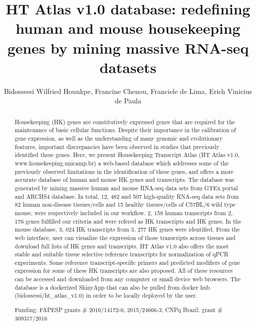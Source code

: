 \documentclass[twoside]{article}
\title{\vspace{-15mm}\fontsize{24pt}{10pt}\selectfont\textbf{ HT Atlas v1.0 database: redefining human and mouse housekeeping genes by mining massive RNA-seq datasets }} %
\author{ Bidossessi Wilfried Hounkpe, Francine Chenou, Franciele de Lima, Erich Vinicius de Paula }
\affil{ Faculty of Medical Sciences,  Unicamp }
\date{}
\begin{document}
  
  
  \maketitle %
  
  
  \thispagestyle{fancy} %
  
  
  \begin{abstract}
  Housekeeping (HK) genes are constitutively expressed genes that are required for the maintenance of basic cellular functions. Despite their importance in the calibration of gene expression,  as well as the understanding of many genomic and evolutionary features,  important discrepancies have been observed in studies that previously identified these genes. Here,  we present Housekeeping Transcript Atlas (HT Atlas v1.0,  www.housekeeping.unicamp.br) a web-based database which addresses some of the previously observed limitations in the identification of these genes,  and offers a more accurate database of human and mouse HK genes and transcripts. The database was generated by mining massive human and mouse RNA-seq data sets from GTEx portal and ARCHS4 database. In total,  12, 482 and 507 high-quality RNA-seq data sets from 82 human non-disease tissues/cells and 15 healthy tissues/cells of C57BL/6 wild type mouse,  were respectively included in our workflow. 2, 158 human transcripts from 2, 176 genes fulfilled our criteria and were refered as  HK transcripts and HK genes. In the mouse database,  3, 024 HK transcripts from 3, 277 HK genes were identified. From the web interface,  user can visualize the expression of those transcripts across tissues and download full lists of HK genes and transcripts. HT Atlas v1.0 also offers the most stable and suitable tissue selective reference transcripts for normalization of qPCR experiments. Some reference transcript-specific primers and predicted modifiers of gene expression for some of these HK transcripts are also proposed. All of these resources can be accessed and downloaded from any computer or small device web browsers. The database is a dockerized ShinyApp that can also be pulled from docker hub (bidossessi/ht\_atlas\_v1.0) in order to be locally deployed by the user.
  
  Funding: FAPESP grants \# 2016/14172-6,   2015/24666-3; CNPq Brazil. grant \# 309317/2016 \\ 
  \end{abstract}
  
\end{document}
